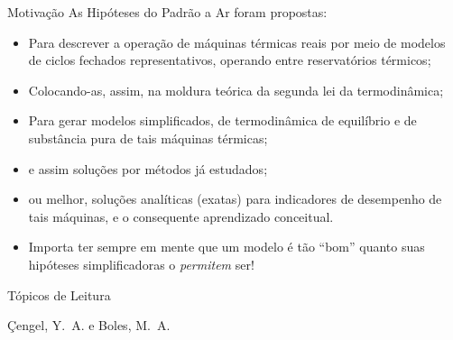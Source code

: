     \begin{frame}{Motivação}\vspace*{-1em}
        As Hipóteses do Padrão a Ar foram propostas:

        \begin{itemize}
            \item<1->  Para descrever a operação de \alert{máquinas térmicas reais} por meio de
                modelos de \alert{ciclos fechados} representativos, operando entre
                \alert{reservatórios térmicos};
            \item<1->  Colocando-as, assim, na moldura teórica da \alert{segunda lei} da
                termodinâmica;
            \item<2->  Para gerar \alert{modelos simplificados}, de termodinâmica de
                \alert{equilíbrio} e de \alert{substância pura} de tais \alert{máquinas
                térmicas};
            \item<2->  e assim soluções por \alert{métodos já estudados};
            \item<2->  ou melhor, \alert{soluções analíticas} (exatas) para \alert{indicadores
                de desempenho} de tais máquinas, e o consequente aprendizado conceitual.
            \item<3->  Importa ter sempre em mente que um \alert{modelo} é tão ``bom'' quanto
                suas \alert{hipóteses simplificadoras} o \emph{permitem} ser!
        \end{itemize}
    \end{frame}

    \begin{frame}[allowframebreaks]{Tópicos de Leitura}
        \begin{thebibliography}{Çengel, Y.~A., 2013}
                Çengel, Y.~A. e Boles, M.~A.
        \end{thebibliography}
    \end{frame}




